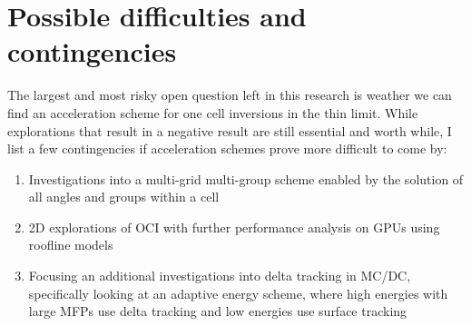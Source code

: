 \section{Possible difficulties and contingencies}
The largest and most risky open question left in this research is weather we can find an acceleration scheme for one cell inversions in the thin limit.
While explorations that result in a negative result are still essential and worth while, I list a few contingencies if acceleration schemes prove more difficult to come by:
\begin{enumerate}
    \item Investigations into a multi-grid multi-group scheme enabled by the solution of all angles and groups within a cell
    \item 2D explorations of OCI with further performance analysis on GPUs using roofline models
    \item Focusing an additional investigations into delta tracking in MC/DC, specifically looking at an adaptive energy scheme, where high energies with large MFPs use delta tracking and low energies use surface tracking
\end{enumerate}

